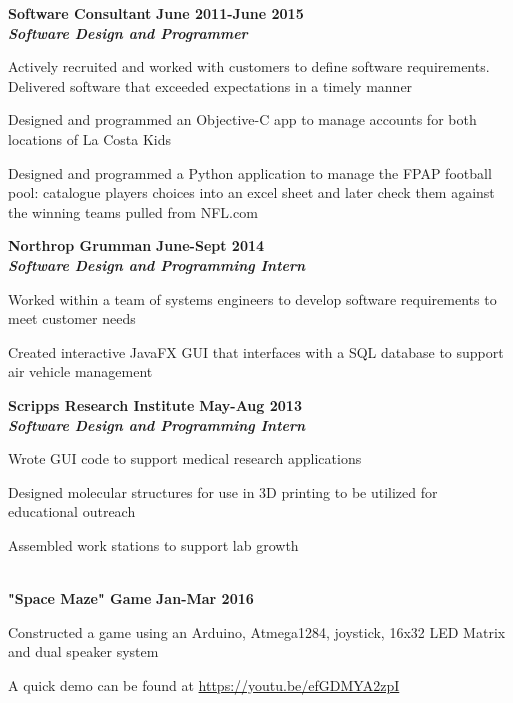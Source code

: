 \documentclass[10pt]{article}
\newcommand{\thing}[1][]{\item #1}
\newcommand{\sectionheader}[1]{
    \vspace{3pt}
    \StrSplit{#1}{3}{\firstpart}{\lastpart} %
    \textbf{\LARGE
        \firstpart
        \lastpart
    }\\[5pt]
}
\newcommand{\dates}[2]{
    \textbf{#1-#2}
}
\begin{document}
    \textbf{\large Software Consultant} \hfill \dates{June 2011}{June 2015}\\
    \textit{\textbf{Software Design and Programmer}}
    \begin{things}
        \thing Actively recruited and worked with customers to define
                software requirements. Delivered software that exceeded
                expectations in a timely manner
        \thing Designed and programmed an Objective-C app to manage
                accounts for both locations of La Costa Kids
        \thing Designed and programmed a Python application to manage
                the FPAP football pool: catalogue players choices
                into an excel sheet and later check them against the
                winning teams pulled from NFL.com
    \end{things}

    \textbf{\large Northrop Grumman} \hfill \dates{June}{Sept 2014}\\
    \textit{\textbf{Software Design and Programming Intern}}
    \begin{things}
        \thing Worked within a team of systems engineers to develop
                software requirements to meet customer needs
        \thing Created interactive JavaFX GUI that interfaces with a
                SQL database to support air vehicle management
    \end{things}


    \textbf{\large Scripps Research Institute} \hfill \dates{May}{Aug 2013}\\
    \textit{\textbf{Software Design and Programming Intern}}
    \begin{things}
        \thing Wrote GUI code to support medical research applications
        \thing Designed molecular structures for use in 3D printing
                to be utilized for educational outreach
        \thing Assembled work stations to support lab growth
    \end{things}

    \sectionheader{Projects}
    \textbf{\large "Space Maze" Game} \hfill \dates{Jan}{Mar 2016}
    \begin{things}
        \thing Constructed a game using an Arduino, Atmega1284,
                joystick, 16x32 LED Matrix and dual speaker system
        \thing A quick demo can be found at \url{https://youtu.be/efGDMYA2zpI}
    \end{things}
\end{document}
